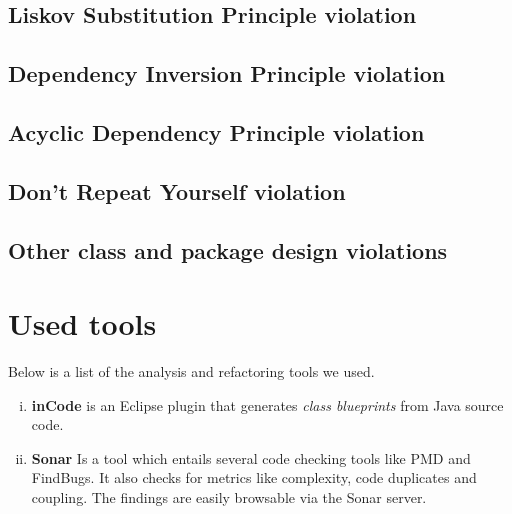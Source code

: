 \documentclass[a4paper, 10pt]{article}
\begin{document}
\subsection{Liskov Substitution Principle violation}
\label{sec:lsp_violation} %



\subsection{Dependency Inversion Principle violation}
\label{sec:dip_violation}


\subsection{Acyclic Dependency Principle violation}
\label{sec:adp_violation}


\subsection{Don't Repeat Yourself violation}
\label{sec:dry_violation}


\subsection{Other class and package design violations}
\label{sec:other_violations}

\newpage
\section{Used tools}
\label{sec:used_tools}

Below is a list of the analysis and refactoring tools we used.


\begin{enumerate}[i)]
\item \textbf{inCode} is an Eclipse plugin that generates \emph{class
    blueprints} from Java source code.
\item \textbf{Sonar}
	Is a tool which entails several code checking tools like PMD and FindBugs. It also checks for metrics like complexity, code duplicates and coupling.
	The findings are easily browsable via the Sonar server.
\end{enumerate}


\end{document}

